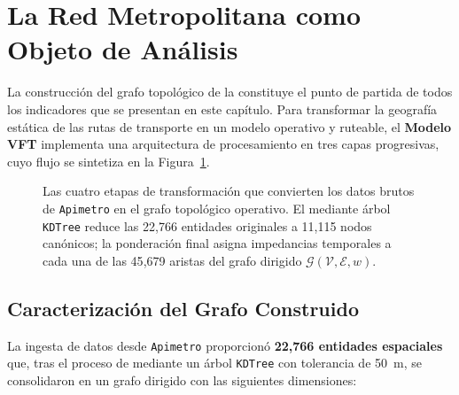 \section{La Red Metropolitana como Objeto de Análisis}
\label{sec:intro-resultados}

La construcción del grafo topológico de la \zmvm constituye el punto de partida
de todos los indicadores que se presentan en este capítulo. Para transformar la
geografía estática de las rutas de transporte en un modelo operativo y ruteable,
el \textbf{Modelo VFT} implementa una arquitectura de procesamiento en tres
capas progresivas, cuyo flujo se sintetiza en la Figura~\ref{fig:arq-capas}.

\begin{figure}[H]
    \centering
    
    \caption[Pipeline de procesamiento del Modelo VFT]{Las cuatro etapas de
    transformación que convierten los datos brutos de \texttt{Apimetro} en el
    grafo topológico operativo. El  mediante
    árbol \texttt{KDTree} reduce las 22{,}766 entidades originales a
    11{,}115 nodos canónicos; la ponderación final asigna impedancias temporales
    a cada una de las 45{,}679 aristas del grafo dirigido
    $\mathcal{G}(\mathcal{V},\mathcal{E},w)$.}
    \label{fig:arq-capas}
\end{figure}

\subsection{Caracterización del Grafo Construido}
\label{subsec:estadisticas-grafo}

La ingesta de datos desde \texttt{Apimetro} proporcionó
\textbf{22{,}766 entidades espaciales} que, tras el proceso de
 mediante un árbol \texttt{KDTree} con
tolerancia de 50~m, se consolidaron en un grafo dirigido con las siguientes
dimensiones:

